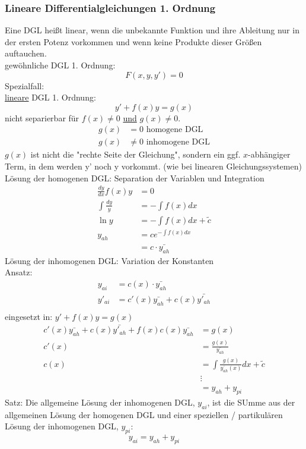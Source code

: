 \documentclass{article}
\begin{document}
\subsubsection{Lineare Differentialgleichungen 1. Ordnung}
Eine DGL heißt linear, wenn die unbekannte Funktion und ihre Ableitung nur in der ersten Potenz vorkommen und wenn keine Produkte dieser Größen auftauchen.\\
gewöhnliche DGL 1. Ordnung:
\begin{equation*}
    F(x,y,y') = 0
\end{equation*}
Spezialfall:\\
\underline{lineare} DGL 1. Ordnung:
\begin{equation*}
    y' + f(x)y = g(x)
\end{equation*}
nicht separierbar für $f(x) \neq 0$ \underline{und} $g(x) \neq 0$.\\
\begin{align*}
    g(x) &= 0 \text{ homogene DGL}\\
    g(x) &\neq 0 \text{ inhomogene DGL}
\end{align*}
$g(x)$ ist nicht die "rechte Seite der Gleichung", sondern ein ggf. $x$-abhängiger Term, in dem werden y' noch y vorkommt. (wie bei linearen Gleichungssystemen)\\
Lösung der homogenen DGL: Separation der Variablen und Integration\\
\begin{align*}
    \frac{dy}{dx} f(x)y &= 0\\
    \int \frac{dy}{y} &= -\int f(x)dx\\
    \ln y &= - \int f(x)dx + \tilde{c}\\
    y_{ah} &= c e^{-\int f(x)dx}\\
    &= c \cdot \bar{y_{ah}} 
\end{align*}
Lösung der inhomogenen DGL: Variation der Konstanten\\
Ansatz:
\begin{align*}
    y_{ai} &= c(x)\cdot \bar{y_{ah}}\\
    y'_{ai} &= c'(x)\bar{y_{ah}}+c(x)\bar{y'_{ah}}\\
\end{align*}
eingesetzt in: $y'+f(x)y = g(x)$
\begin{align*}
    c'(x)\bar{y_{ah}}+c(x)\bar{y'_{ah}} + f(x)c(x)\bar{y_{ah}} &= g(x)\\
    c'(x) &= \frac{g(x)}{\bar{y_{ah}}}\\
    c(x) &= \int \frac{g(x)}{\bar{y_{ah}}(x)}dx+\tilde{c}\\
    &\vdots\\
    &= y_{ah} + y_{pi}
\end{align*}
Satz: Die allgemeine Lösung der inhomogenen DGL, $y_{ai}$, ist die SUmme aus der allgemeinen Lösung der homogenen DGL und einer speziellen / partikulären Lösung der inhomogenen DGL, $y_{pi}$:
\begin{equation*}
    y_{ai} = y_{ah} + y_{pi}
\end{equation*}
\end{document}
